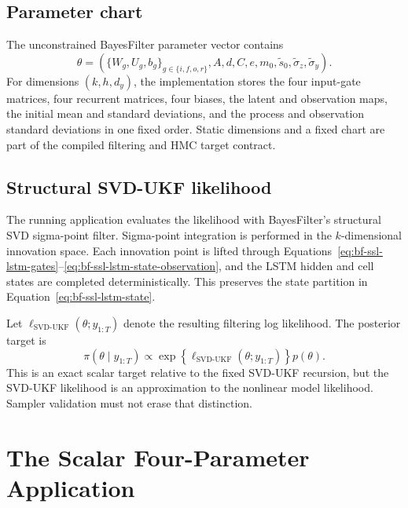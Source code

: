 \subsection{Parameter chart}
\label{subsec:bf-ssl-lstm-parameter-chart}

The unconstrained BayesFilter parameter vector contains
\begin{equation}
  \theta =
  \left(
    \{W_g,U_g,b_g\}_{g\in\{i,f,o,r\}},
    A,d,C,e,m_0,\widetilde s_0,
    \widetilde\sigma_z,\widetilde\sigma_y
  \right).
  \label{eq:bf-ssl-lstm-parameter-chart}
\end{equation}
For dimensions $(k,h,d_y)$, the implementation stores the four input-gate
matrices, four recurrent matrices, four biases, the latent and observation
maps, the initial mean and standard deviations, and the process and
observation standard deviations in one fixed order.  Static dimensions and a
fixed chart are part of the compiled filtering and HMC target contract.

\subsection{Structural SVD-UKF likelihood}
\label{subsec:bf-ssl-lstm-svd-ukf-likelihood}

The running application evaluates the likelihood with BayesFilter's structural
SVD sigma-point filter.  Sigma-point integration is performed in the
$k$-dimensional innovation space.  Each innovation point is lifted through
Equations~\eqref{eq:bf-ssl-lstm-gates}--\eqref{eq:bf-ssl-lstm-state-observation},
and the LSTM hidden and cell states are completed deterministically.  This
preserves the state partition in Equation~\eqref{eq:bf-ssl-lstm-state}.

Let $\ell_{\mathrm{SVD\text{-}UKF}}(\theta;y_{1:T})$ denote the resulting
filtering log likelihood.  The posterior target is
\begin{equation}
  \pi(\theta\mid y_{1:T})
  \propto
  \exp\!\left\{\ell_{\mathrm{SVD\text{-}UKF}}
    (\theta;y_{1:T})\right\}p(\theta).
  \label{eq:bf-ssl-lstm-filtering-posterior}
\end{equation}
This is an exact scalar target relative to the fixed SVD-UKF recursion, but the
SVD-UKF likelihood is an approximation to the nonlinear model likelihood.
Sampler validation must not erase that distinction.

\section{The Scalar Four-Parameter Application}
\label{sec:bf-scalar-ssl-lstm-application}

